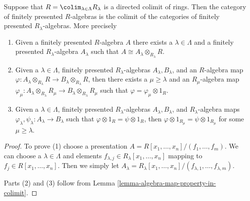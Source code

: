 \begin{lemma}
\label{lemma-colimit-category-fp-algebras}
Suppose that $R = \colim_{\lambda \in \Lambda} R_\lambda$ is a directed colimit
of rings. Then the category of finitely presented $R$-algebras is
the colimit of the categories of finitely presented $R_\lambda$-algebras.
More precisely
\begin{enumerate}
\item Given a finitely presented $R$-algebra $A$ there exists a
$\lambda \in \Lambda$ and a finitely presented $R_\lambda$-algebra
$A_\lambda$ such that $A \cong A_\lambda \otimes_{R_\lambda} R$.
\item Given a $\lambda \in \Lambda$, finitely presented
$R_\lambda$-algebras $A_\lambda, B_\lambda$, and an $R$-algebra map
$\varphi : A_\lambda \otimes_{R_\lambda} R \to B_\lambda \otimes_{R_\lambda} R$,
then there exists a $\mu \geq \lambda$ and an $R_\mu$-algebra map
$\varphi_\mu : A_\lambda \otimes_{R_\lambda} R_\mu \to
B_\lambda \otimes_{R_\lambda} R_\mu$
such that $\varphi = \varphi_\mu \otimes 1_R$.
\item Given a $\lambda \in \Lambda$, finitely presented
$R_\lambda$-algebras $A_\lambda, B_\lambda$, and $R_\lambda$-algebra maps
$\varphi_\lambda, \psi_\lambda : A_\lambda \to B_\lambda$
such that $\varphi \otimes 1_R = \psi \otimes 1_R$, then
$\varphi \otimes 1_{R_\mu} = \psi \otimes 1_{R_\mu}$ for some
$\mu \geq \lambda$.
\end{enumerate}
\end{lemma}

\begin{proof}
To prove (1) choose a presentation
$A = R[x_1, \ldots, x_n]/(f_1, \ldots, f_m)$.
We can choose a $\lambda \in \Lambda$ and elements
$f_{\lambda, j} \in R_\lambda[x_1, \ldots, x_n]$ mapping to
$f_j \in R[x_1, \ldots, x_n]$.
Then we simply let
$A_\lambda =
R_\lambda[x_1, \ldots, x_n]/(f_{\lambda, 1}, \ldots, f_{\lambda, m})$.

\medskip\noindent
Parts (2) and (3) follow from
Lemma \ref{lemma-algebra-map-property-in-colimit}.
\end{proof}
